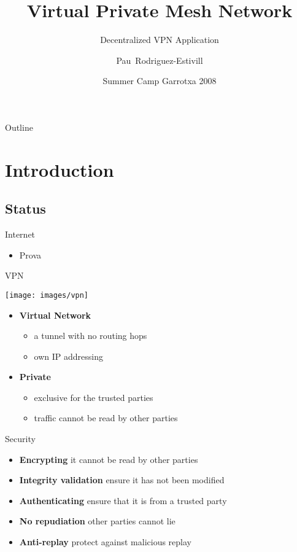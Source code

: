 \documentclass{beamer}
\title[VPMN]{Virtual Private Mesh Network} %
\subtitle{Decentralized VPN Application} %
\author[Pau]{Pau~Rodriguez-Estivill}
\institute[EPSC UPC] %
{
  Escola Polit\`ecnica Superior de Castelldefels\\
  Universitat Polit\`ecnica de Catalunya
}
\date[SCG08] %
{Summer Camp Garrotxa 2008}
\begin{document}
\begin{frame}
  \titlepage
\end{frame}

\begin{frame}{Outline}
  \tableofcontents
\end{frame}



\section{Introduction}
\subsection*{Status}
\begin{frame}{Internet}
	\begin{itemize}
	\item Prova
	\end{itemize}
\end{frame}
\begin{frame}{VPN}
	\begin{center}
	\texttt{[image: images/vpn]}
	\end{center}
	\begin{itemize}
	\item \textbf{Virtual Network}
		\begin{itemize}
		\item a tunnel with no routing hops
		\item own IP addressing
		\end{itemize}
	\item \textbf{Private}
		\begin{itemize}
		\item exclusive for the trusted parties
		\item traffic cannot be read by other parties
		\end{itemize}
	\end{itemize}
\end{frame}
\begin{frame}{Security}
	\begin{itemize}
	\item \textbf{Encrypting} it cannot be read by other parties
	\item \textbf{Integrity validation} ensure it has not been modified
	\item \textbf{Authenticating} ensure that it is from a trusted party
	\item \textbf{No repudiation} other parties cannot lie
	\item \textbf{Anti-replay} protect against malicious replay
	\end{itemize}
\end{frame}
\end{document}
